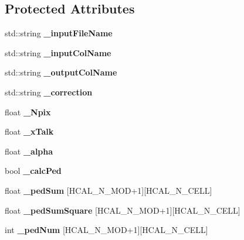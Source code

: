 \subsection*{Protected Attributes}
\begin{DoxyCompactItemize}
\item 
std::string {\bfseries \_\-inputFileName}\label{classCALICE_1_1SimpleHcalCalibrationProcessor_ada93508b2a02a9a4dab8b5ce5e8ffe8a}

\item 
std::string {\bfseries \_\-inputColName}\label{classCALICE_1_1SimpleHcalCalibrationProcessor_ae474eee8b25a5bfdf2132f87ff548b60}

\item 
std::string {\bfseries \_\-outputColName}\label{classCALICE_1_1SimpleHcalCalibrationProcessor_ad93fe1c519b7f99ad86a6ec1f624d39b}

\item 
std::string {\bfseries \_\-correction}\label{classCALICE_1_1SimpleHcalCalibrationProcessor_af698bdfb5a6b93d1d1034a253392a4ee}

\item 
float {\bfseries \_\-Npix}\label{classCALICE_1_1SimpleHcalCalibrationProcessor_a780cf082fc115f8550d59f9702e532be}

\item 
float {\bfseries \_\-xTalk}\label{classCALICE_1_1SimpleHcalCalibrationProcessor_a441b3b542c04f43d466fed83f85563d5}

\item 
float {\bfseries \_\-alpha}\label{classCALICE_1_1SimpleHcalCalibrationProcessor_a0f42d4efbe64af7ad6f99c6f661b7aa5}

\item 
bool {\bfseries \_\-calcPed}\label{classCALICE_1_1SimpleHcalCalibrationProcessor_a33e3edf193d34df72346964fbec120fc}

\item 
float {\bfseries \_\-pedSum} [HCAL\_\-N\_\-MOD+1][HCAL\_\-N\_\-CELL]\label{classCALICE_1_1SimpleHcalCalibrationProcessor_ae10ee914952e85b65190db373434d280}

\item 
float {\bfseries \_\-pedSumSquare} [HCAL\_\-N\_\-MOD+1][HCAL\_\-N\_\-CELL]\label{classCALICE_1_1SimpleHcalCalibrationProcessor_a6ebcb182a15e4ee35546f46f546c2aa6}

\item 
int {\bfseries \_\-pedNum} [HCAL\_\-N\_\-MOD+1][HCAL\_\-N\_\-CELL]\label{classCALICE_1_1SimpleHcalCalibrationProcessor_a5159b526798ba64ed5e8ba6a53e172da}


\end{DoxyCompactItemize}
